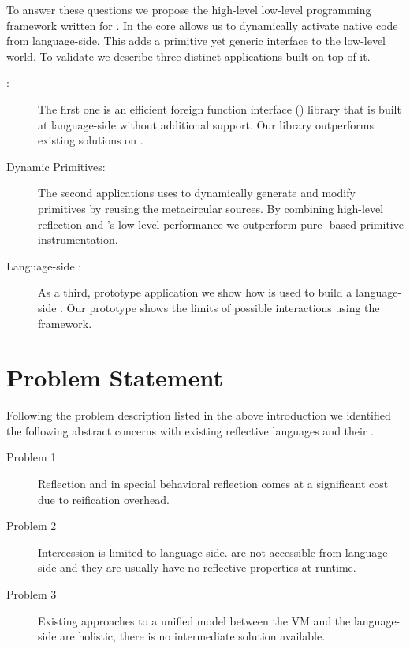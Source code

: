 To answer these questions we propose the high-level low-level programming framework \B written for \PH.
In the core \B allows us to dynamically activate native code from language-side.
This adds a primitive yet generic interface to the low-level \VM world.
To validate \B we describe three distinct applications built on top of it.
%
\begin{description}
	\item[\FFI:] The first one is an efficient foreign function interface (\FFI) library that is built at language-side without additional \VM support.
	Our \FFI library outperforms existing solutions on \PH.
	
	\item[Dynamic Primitives:] The second applications uses \B to dynamically generate and modify \PH primitives by reusing the metacircular \VM sources.
	By combining high-level reflection and \B's low-level performance we outperform pure \PH-based primitive instrumentation.
	
	\item[Language-side \JIT:] As a third, prototype application we show how \B is used to build a language-side \JIT.
	Our prototype shows the limits of possible \VM interactions using the \B framework. 
\end{description}


\section{Problem Statement}
Following the problem description listed in the above introduction we identified the following abstract concerns with existing reflective languages and their \VMs.
%
\begin{description}
	\item[Problem 1] Reflection and in special behavioral reflection comes at a significant cost due to reification overhead.
		
	\item[Problem 2] Intercession is limited to language-side.
	\VMs are not accessible from language-side and they are usually have no reflective properties at runtime. 
	
	\item[Problem 3] Existing approaches to a unified model between the VM and the language-side are holistic, there is no intermediate solution available.
\end{description}

